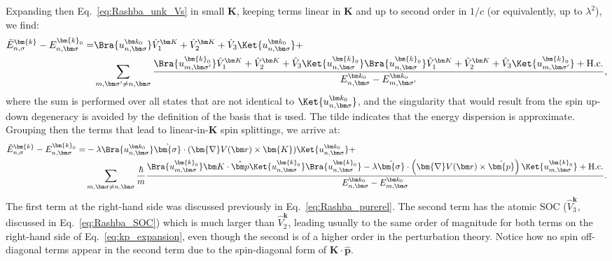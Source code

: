 Expanding then Eq.~\eqref{eq:Rashba_unk_Vs} in small $\bm{K}$, keeping terms linear in $\bm{K}$ and up to second order in $1/c$ (or equivalently, up to $\lambda^2$), we find:
\begin{align}
	\tilde{E}_{n,\sigma}^{\bm{k}} - E_{n,\bm \sigma}^{\bm{k}_0} =& \Bra{u_{n,\bm \sigma}^{\bm k_0}} \hat{V}_1^{\bm K} + \hat{V}_2^{\bm K} + \hat{V}_3\Ket{u_{n,\bm \sigma}^{\bm k_0}}+ \\
		& \sum_{m,\bm \sigma' \neq n,\bm \sigma}\frac{\Bra{u_{m,\bm \sigma'}^{\bm{k}_0}} \hat{V}_1^{\bm K} + \hat{V}_2^{\bm K} + \hat{V}_3\Ket{u_{n, \bm \sigma}^{\bm{k}_0}}\Bra{u_{n, \bm \sigma}^{\bm{k}_0}}  \hat{V}_1^{\bm K} + \hat{V}_2^{\bm K} + \hat{V}_3 \Ket{u_{m, \bm \sigma'}^{\bm{k}_0}}+\rm{H.c.}}{E_{n, \bm \sigma}^{\bm k_0}- E_{m, \bm \sigma'}^{\bm k_0}},
\end{align}
where the sum is performed over all states that are not identical to $\Ket{u_{n,\bm \sigma}^{\bm k_0}}$, and the singularity that would result from the spin up-down degeneracy is avoided by the definition of the basis that is used. The tilde indicates that the energy dispersion is approximate.
Grouping then the terms that lead to linear-in-$\bm K$ spin splittings, we arrive at:
\begin{align}
	\label{eq:kp_expansion}
	\tilde{E}_{n,\sigma}^{\bm{k}} - E_{n,\bm \sigma}^{\bm{k}_0} =& -\lambda \Bra{u_{n,\bm \sigma}^{\bm k_0}}  \hat{\bm{\sigma}} \cdot ( \bm{\nabla}V(\bm r) \times \bm{K}) \Ket{u_{n,\bm \sigma}^{\bm k_0}} + \\
		& \sum_{m,\bm \sigma \neq n,\bm \sigma}\frac{\hbar}{m}\frac{\Bra{u_{m,\bm \sigma}^{\bm{k}_0}} \bm K \cdot \hat{\bm p} \Ket{u_{n, \bm \sigma}^{\bm{k}_0}}\Bra{u_{n, \bm \sigma}^{\bm{k}_0}} -\lambda \hat{\bm{\sigma}} \cdot \left( \bm{\nabla}V(\bm r) \times \hat{\bm{p}}\right) \Ket{u_{m, \bm \sigma}^{\bm{k}_0}} + \rm{H.c.}}{E_{n, \bm \sigma}^{\bm k_0}- E_{m, \bm \sigma}^{\bm k_0}}.\nonumber
\end{align}
The first term at the right-hand side was discussed previously in Eq.~\eqref{eq:Rashba_purerel}.
The second term has the atomic \gls{SOC} ($\hat{V}^{\bm k}_3$, discussed in Eq.~\eqref{eq:Rashba_SOC}) which is much larger than $\hat{V}^{\bm{k}}_2$, leading usually to the same order of magnitude for both terms on the right-hand side of Eq.~\eqref{eq:kp_expansion}, even though the second is of a higher order in the perturbation theory. Notice how no spin off-diagonal terms appear in the second term due to the spin-diagonal form of $\bm K \cdot \hat{\bm p}$.

